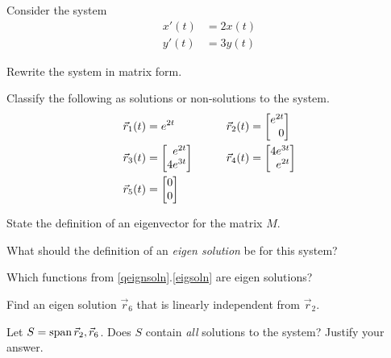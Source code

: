 \documentclass{workbook}
\begin{document}
%
%

\begin{slide}
	\question
	\label{qeignsoln}
	Consider the system
	\begin{align*}
		x'(t) &= 2x(t)\\
		y'(t) &= 3y(t)
	\end{align*}

	\begin{parts}
		\item Rewrite the system in matrix form.
		\item 
		\label{eigsoln}
		Classify the following as solutions or non-solutions to the system.
		\begin{align*}
			\vec r_1(t) &= e^{2t} &\qquad			\vec r_2(t) &= \mat{e^{2t}\\0}\\
			\vec r_3(t) &= \mat{e^{2t}\\4e^{3t}} &\qquad			\vec r_4(t) &= \mat{4e^{3t}\\e^{2t}}\\
			\vec r_5(t) &= \mat{0\\0}
		\end{align*}
		\item State the definition of an eigenvector for the matrix $M$.
		\item What should the definition of an \emph{eigen solution} be for this system?
		\item Which functions from \ref{qeignsoln}.\ref{eigsoln} are eigen solutions?
		\item Find an eigen solution $\vec r_6$ that is linearly independent from $\vec r_2$.
		\item Let $S=\operatorname{span}{\vec r_2, \vec r_6}$. Does $S$ contain \emph{all} solutions to the system? Justify your answer.
	
	\end{parts}
\end{slide}
\end{document}
